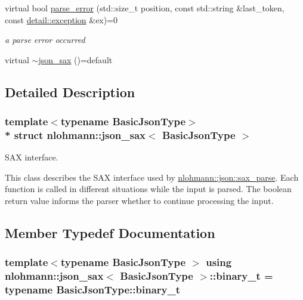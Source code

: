 \begin{DoxyCompactItemize}
virtual bool \hyperlink{structnlohmann_1_1json__sax_a60287e3bd85f489e04c83f7e3b76e613}{parse\+\_\+error} (std\+::size\+\_\+t position, const std\+::string \&last\+\_\+token, const \hyperlink{classnlohmann_1_1detail_1_1exception}{detail\+::exception} \&ex)=0
\begin{DoxyCompactList}\small\item\em a parse error occurred \end{DoxyCompactList}\item 
virtual \hyperlink{structnlohmann_1_1json__sax_af31bacfa81aa7818d8639d1da65c8eb5}{$\sim$json\+\_\+sax} ()=default
\end{DoxyCompactItemize}


\subsection{Detailed Description}
\subsubsection*{template$<$typename Basic\+Json\+Type$>$\\*
struct nlohmann\+::json\+\_\+sax$<$ Basic\+Json\+Type $>$}

S\+AX interface. 

This class describes the S\+AX interface used by \hyperlink{classnlohmann_1_1basic__json_a12b382c6407da5543827ce4b24bb5008}{nlohmann\+::json\+::sax\+\_\+parse}. Each function is called in different situations while the input is parsed. The boolean return value informs the parser whether to continue processing the input. 

\subsection{Member Typedef Documentation}
\subsubsection[{\texorpdfstring{binary\+\_\+t}{binary_t}}]{\setlength{\rightskip}{0pt plus 5cm}template$<$typename Basic\+Json\+Type $>$ using {\bf nlohmann\+::json\+\_\+sax}$<$ Basic\+Json\+Type $>$\+::{\bf binary\+\_\+t} =  typename Basic\+Json\+Type\+::binary\+\_\+t}\hypertarget{structnlohmann_1_1json__sax_a0ef406ba81eef08aadf4a9ef48d742bd}{}\label{structnlohmann_1_1json__sax_a0ef406ba81eef08aadf4a9ef48d742bd}
